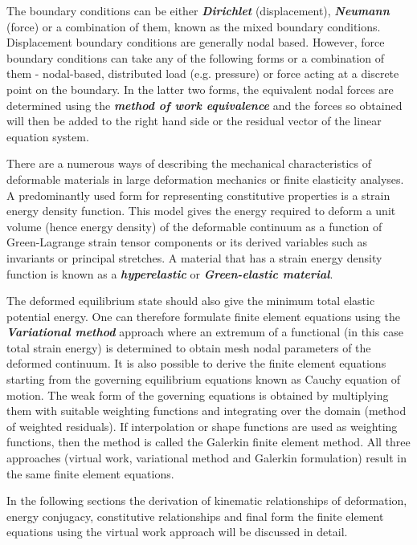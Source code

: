 The boundary conditions can be either \textit{\textbf{Dirichlet}}
(displacement), \textit{\textbf{Neumann}} (force) or a combination of them,
known as the mixed boundary conditions. Displacement boundary conditions are
generally nodal based. However, force boundary conditions can take any of the
following forms or a combination of them - nodal-based, distributed load
(e.g. pressure) or force acting at a discrete point on the boundary. In the
latter two forms, the equivalent nodal forces are determined using the
\textit{\textbf{method of work equivalence}} \cite{hutton:2004} and the forces
so obtained will then be added to the right hand side or the residual vector
of the linear equation system.

There are a numerous ways of describing the mechanical characteristics of
deformable materials in large deformation mechanics or finite elasticity
analyses. A predominantly used form for representing constitutive properties
is a strain energy density function. This model gives the energy required to
deform a unit volume (hence energy density) of the deformable continuum as a
function of Green-Lagrange strain tensor components or its derived variables
such as invariants or principal stretches. A material that has a strain energy
density function is known as a \textit{\textbf{hyperelastic}} or
\textit{\textbf{Green-elastic material}}.

The deformed equilibrium state should also give the minimum total elastic
potential energy. One can therefore formulate finite element equations using
the \textit{\textbf{Variational method}} approach where an extremum of a
functional (in this case total strain energy) is determined to obtain mesh
nodal parameters of the deformed continuum. It is also possible to derive the
finite element equations starting from the governing equilibrium equations
known as Cauchy equation of motion. The weak form of the governing equations
is obtained by multiplying them with suitable weighting functions and
integrating over the domain (method of weighted residuals). If interpolation
or shape functions are used as weighting functions, then the method is called
the Galerkin finite element method. All three approaches (virtual work,
variational method and Galerkin formulation) result in the same finite element
equations.

In the following sections the derivation of kinematic relationships of
deformation, energy conjugacy, constitutive relationships and final form the
finite element equations using the virtual work approach will be discussed in
detail.

